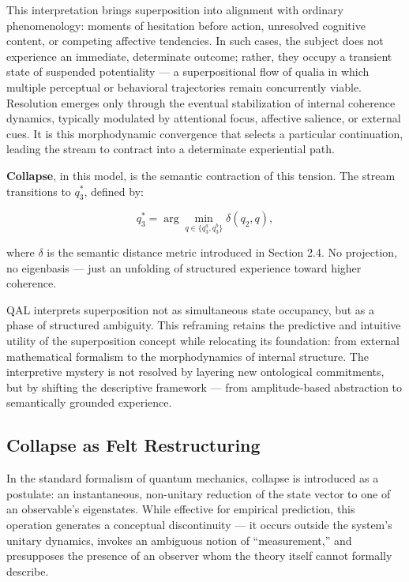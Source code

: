 \documentclass[11pt]{article}
\numberwithin{equation}{section} %
\begin{document}
This interpretation brings superposition into alignment with ordinary phenomenology: moments of hesitation before action, unresolved cognitive content, or competing affective tendencies. In such cases, the subject does not experience an immediate, determinate outcome; rather, they occupy a transient state of suspended potentiality — a superpositional flow of qualia in which multiple perceptual or behavioral trajectories remain concurrently viable. Resolution emerges only through the eventual stabilization of internal coherence dynamics, typically modulated by attentional focus, affective salience, or external cues. It is this morphodynamic convergence that selects a particular continuation, leading the stream to contract into a determinate experiential path.

\textbf{Collapse}, in this model, is the semantic contraction of this tension. The stream transitions to \( q_3^* \), defined by:

\begin{equation}
q_3^* = \arg\min_{q \in \{q_3^a, q_3^b\}} \delta(q_2, q),
\end{equation}

\noindent where \( \delta \) is the semantic distance metric introduced in Section 2.4. No projection, no eigenbasis — just an unfolding of structured experience toward higher coherence.

QAL interprets superposition not as simultaneous state occupancy, but as a phase of structured ambiguity. This reframing retains the predictive and intuitive utility of the superposition concept while relocating its foundation: from external mathematical formalism to the morphodynamics of internal structure. The interpretive mystery is not resolved by layering new ontological commitments, but by shifting the descriptive framework — from amplitude-based abstraction to semantically grounded experience.

\subsection{Collapse as Felt Restructuring}

In the standard formalism of quantum mechanics, collapse is introduced as a postulate: an instantaneous, non-unitary reduction of the state vector to one of an observable’s eigenstates. While effective for empirical prediction, this operation generates a conceptual discontinuity — it occurs outside the system’s unitary dynamics, invokes an ambiguous notion of “measurement,” and presupposes the presence of an observer whom the theory itself cannot formally describe.
\end{document}
